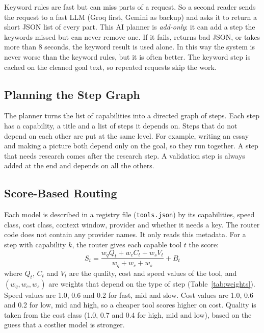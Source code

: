 \documentclass[conference]{IEEEtran}
\begin{document}
Keyword rules are fast but can miss parts of a request. So a second reader sends the request to a fast
LLM (Groq first, Gemini as backup) and asks it to return a short JSON list of every part. This AI
planner is \emph{add-only}: it can add a step the keywords missed but can never remove one. If it fails,
returns bad JSON, or takes more than 8 seconds, the keyword result is used alone. In this way the system
is never worse than the keyword rules, but it is often better. The keyword step is cached on the cleaned
goal text, so repeated requests skip the work.

\subsection{Planning the Step Graph}
The planner turns the list of capabilities into a directed graph of steps. Each step has a capability, a
title and a list of steps it depends on. Steps that do not depend on each other are put at the same level.
For example, writing an essay and making a picture both depend only on the goal, so they run together. A
step that needs research comes after the research step. A validation step is always added at the end and
depends on all the others.

\subsection{Score-Based Routing}
Each model is described in a registry file (\texttt{tools.json}) by its capabilities, speed class, cost
class, context window, provider and whether it needs a key. The router code does not contain any
provider names. It only reads this metadata. For a step with capability $k$, the router gives each
capable tool $t$ the score:
\begin{equation}
S_t = \frac{w_q Q_t + w_c C_t + w_s V_t}{w_q + w_c + w_s} + B_t
\label{eq:score}
\end{equation}
where $Q_t$, $C_t$ and $V_t$ are the quality, cost and speed values of the tool, and $(w_q, w_c, w_s)$
are weights that depend on the type of step (Table~\ref{tab:weights}). Speed values are 1.0, 0.6 and 0.2
for fast, mid and slow. Cost values are 1.0, 0.6 and 0.2 for low, mid and high, so a cheaper tool scores
higher on cost. Quality is taken from the cost class (1.0, 0.7 and 0.4 for high, mid and low), based on
the guess that a costlier model is stronger.
\end{document}
